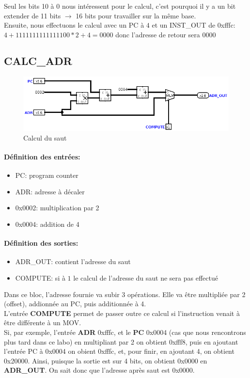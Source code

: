\documentclass[a4paper]{article} %
\begin{document}
    \medskip
Seul les bits 10 à 0 nous intéressent pour le calcul, c'est pourquoi il y a un bit extender de 11 bits $\rightarrow$ 16 bits pour travailler sur la même base.\\
Ensuite, nous effectuons le calcul avec un PC à $4$ et un INST\_OUT de 0xfffc: $4 + 1111111111111100 * 2 + 4=0000$ donc l'adresse de retour sera $0000$

\subsection{CALC\_ADR} \label{bl_calc_adr}
\begin{figure}[H]
    \centering
    \includegraphics[width=.8\textwidth]{src/CALC_ADR.png}
    \caption{Calcul du saut}
    \label{bl_calc_adr}
\end{figure}
\paragraph{Définition des entrées:}
\begin{itemize}
    \item     PC: program counter
    \item     ADR: adresse à décaler
    \item     0x0002: multiplication par 2
    \item     0x0004: addition de 4
\end{itemize}

\paragraph{Définition des sorties:}
\begin{itemize}
    \item ADR\_OUT: contient l'adresse du saut
    \item COMPUTE: si à $1$ le calcul de l'adresse du saut ne sera pas effectué
\end{itemize}
\medskip
Dans ce bloc, l'adresse fournie va subir 3 opérations. Elle va être multipliée par 2 (offset), addionnée au PC, puis additionnée à 4.\\
L'entrée \textbf{COMPUTE} permet de passer outre ce calcul si l'instruction venait à être différente à un MOV.
\\
Si, par exemple, l'entrée \textbf{ADR} 0xfffc, et le \textbf{PC} 0x0004 (cas que nous rencontrons plus tard dans ce labo) en multipliant par 2 on obtient 0xfff8, puis en ajoutant l'entrée PC à 0x0004 on obient 0xfffc, et, pour finir, en ajoutant 4, on obtient 0x20000. Ainsi, puisque la sortie est sur 4 bits, on obtient 0x0000 en \textbf{ADR\_OUT}. On sait donc que l'adresse après saut est 0x0000.
\end{document}
